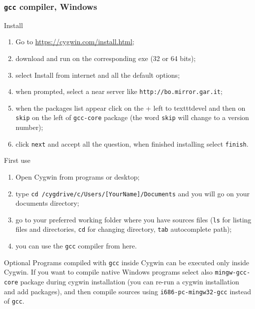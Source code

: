 \begin{frame}
  \frametitle{\texttt{gcc} compiler, Windows}
  \begin{block}{Install}
    \begin{enumerate}
    \item Go to \url{https://cygwin.com/install.html};
    \item download and run on the corresponding \alert{exe} (32 or 64 bits);
    \item select \alert{Install from internet} and all the default options;
    \item when prompted, select a near server like \alert{\texttt{http://bo.mirror.gar.it}};
    \item when the packages list appear click on the + left to \alert{texttt{devel}} and then on \alert{\texttt{skip}} on the left of \alert{\texttt{gcc-core}} package (the word \texttt{skip} will change to a version number);
    \item click \alert{\texttt{next}} and accept all the question, when finished installing select \alert{\texttt{finish}}.
    \end{enumerate}
  \end{block}
  \begin{block}{First use}
    \begin{enumerate}
    \item Open Cygwin from programs or desktop;
    \item type \alert{\texttt{cd /cygdrive/c/Users/[YourName]/Documents}} and you will go on your documents directory;
    \item go to your preferred working folder where you have sources files (\alert{\texttt{ls}} for listing files and directories, \alert{\texttt{cd}} for changing directory, \alert{\texttt{tab}} autocomplete path);
    \item you can use the \alert{\texttt{gcc}} compiler from here.
    \end{enumerate}
  \end{block}
  \begin{block}{Optional}
    Programs compiled with \alert{\texttt{gcc}} inside Cygwin can be executed only inside Cygwin.
    If you want to compile native Windows programs select also \alert{\texttt{mingw-gcc-core}} package during cygwin installation (you can re-run a cygwin installation and add packages), and then compile sources using \alert{\texttt{i686-pc-mingw32-gcc}} instead of \alert{\texttt{gcc}}.
  \end{block}
\end{frame}

